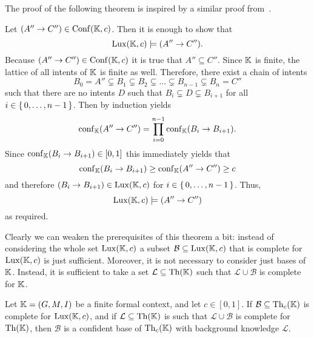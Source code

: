 The proof of the following theorem is inspired by a similar proof
from~\cite{DBLP:conf/ki/StummeTBPL01}.

\begin{Proof}
  Let $(A'' \to C'') \in \operatorname{Conf}({\mathbb{K}}, c)$.  Then it is enough to show that
  \begin{equation*}
    \operatorname{Lux}({\mathbb{K}}, c) \models (A'' \to C'').
  \end{equation*}
  Because $(A'' \to C'') \in \operatorname{Conf}({\mathbb{K}}, c)$ it is true that $A'' \subseteq C''$.  Since
  ${\mathbb{K}}$ is finite, the lattice of all intents of ${\mathbb{K}}$ is finite as well.
  Therefore, there exist a chain of intents
  \begin{equation*}
    B_0 = A'' \subsetneq B_1 \subsetneq B_2 \subsetneq \dots \subsetneq B_{n-1} \subsetneq B_n = C''
  \end{equation*}
  such that there are no intents $D$ such that $B_i \subsetneq D \subsetneq B_{i+1}$ for
  all $i \in {\ensuremath{\{\, 0, \dots, n-1 \,\}}}$.  Then by induction
   yields
  \begin{equation*}
    \operatorname{conf}_{{\mathbb{K}}}(A'' \to C'') = \prod_{i = 0}^{n-1} \operatorname{conf}_{{\mathbb{K}}}(B_i \to B_{i+1}).
  \end{equation*}
  Since $\operatorname{conf}_{{\mathbb{K}}}(B_i \to B_{i+1}) \in [0,1]$ this immediately yields that
  \begin{equation*}
    \operatorname{conf}_{{\mathbb{K}}}(B_i \to B_{i+1}) \ge \operatorname{conf}_{{\mathbb{K}}}(A'' \to C'') \ge c
  \end{equation*}
  and therefore $(B_i \to B_{i+1}) \in \operatorname{Lux}({\mathbb{K}}, c)$ for $i \in {\ensuremath{\{\,0, \dots, n-1\,\}}}$.  Thus,
  \begin{equation*}
    \operatorname{Lux}({\mathbb{K}}, c) \models (A'' \to C'')
  \end{equation*}
  as required.
\end{Proof}

Clearly we can weaken the prerequisites of this theorem a bit: instead of considering the
whole set $\operatorname{Lux}({\mathbb{K}}, c)$ a subset $\mathcal{B} \subseteq \operatorname{Lux}({\mathbb{K}}, c)$ that is
complete for $\operatorname{Lux}({\mathbb{K}}, c)$ is just sufficient.  Moreover, it is not necessary to
consider just bases of ${\mathbb{K}}$.  Instead, it is sufficient to take a set $\mathcal{L}
\subseteq \operatorname{Th}({\mathbb{K}})$ such that $\mathcal{L} \cup \mathcal{B}$ is complete for ${\mathbb{K}}$.

\begin{Corollary}
  \label{cor:weakened-luxenburger-base}
  Let ${\mathbb{K}} = (G, M, I)$ be a finite formal context, and let $c \in [0,1]$.  If
  $\mathcal{B} \subseteq \operatorname{Th}_c({\mathbb{K}})$ is complete for $\operatorname{Lux}({\mathbb{K}}, c)$, and if
  $\mathcal{L} \subseteq \operatorname{Th}({\mathbb{K}})$ is such that $\mathcal{L} \cup \mathcal{B}$ is
  complete for $\operatorname{Th}({\mathbb{K}})$, then $\mathcal{B}$ is a confident base of $\operatorname{Th}_c({\mathbb{K}})$
  with background knowledge $\mathcal{L}$.
\end{Corollary}

